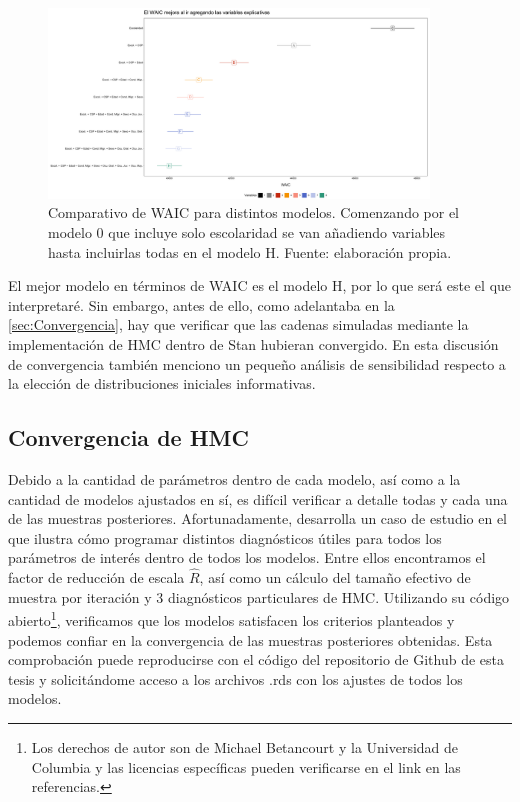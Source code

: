 \begin{figure}[h]
	\centering
	\includegraphics[width = 0.9\textwidth]{Figs/Modelado/Graf_WAIC_Modelos_Compuestos}
	\caption{Comparativo de WAIC para distintos modelos. Comenzando por el modelo 0 que incluye solo escolaridad se van añadiendo variables hasta incluirlas todas en el modelo H. Fuente: elaboración propia.}
	\label{fig:Compara_WAIC_Compuestos}
\end{figure}

El mejor modelo en términos de WAIC es el modelo H, por lo que será este el que interpretaré. Sin embargo, antes de ello, como adelantaba en la \autoref{sec:Convergencia}, hay que verificar que las cadenas simuladas mediante la implementación de HMC dentro de Stan hubieran convergido. En esta discusión de convergencia también menciono un pequeño análisis de sensibilidad respecto a la elección de distribuciones iniciales informativas.\\

\subsection{Convergencia de HMC}

Debido a la cantidad de parámetros dentro de cada modelo, así como a la cantidad de modelos ajustados en sí, es difícil verificar a detalle todas y cada una de las muestras posteriores. Afortunadamente, \textcite{BetancourtRStanWorkflow} desarrolla un caso de estudio en el que ilustra cómo programar distintos diagnósticos útiles para todos los parámetros de interés dentro de todos los modelos. Entre ellos encontramos el factor de reducción de escala $\hat{R}$, así como un cálculo del tamaño efectivo de muestra por iteración y 3 diagnósticos particulares de HMC. Utilizando su código abierto\footnote{Los derechos de autor son de Michael Betancourt y la Universidad de Columbia y las licencias específicas pueden verificarse en el link en las referencias.}, verificamos que los modelos satisfacen los criterios planteados y podemos confiar en la convergencia de las muestras posteriores obtenidas. Esta comprobación puede reproducirse con el código del repositorio de Github de esta tesis y solicitándome acceso a los archivos .rds con los ajustes de todos los modelos.\\

